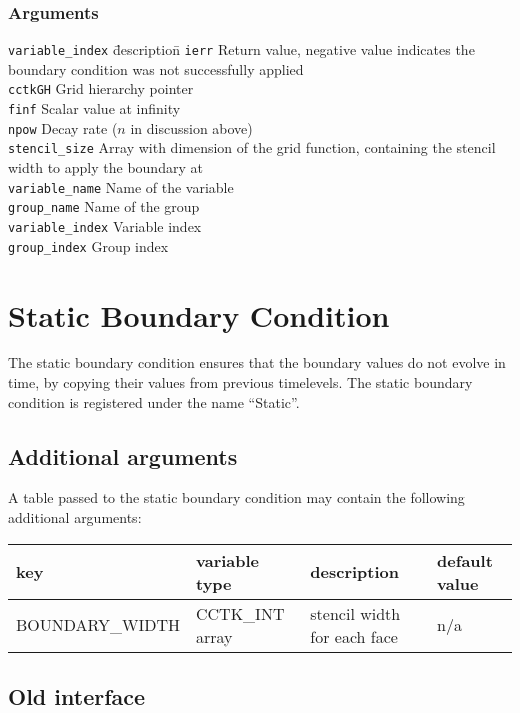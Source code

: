 \documentclass{article}
\begin{document}
\subsubsection*{Arguments}
\begin{tabbing}
{\tt variable\_index} \= description\=\kill
{\tt ierr} \> Return value, negative value indicates the
boundary condition was not successfully applied\\
{\tt cctkGH} \> Grid hierarchy pointer\\
{\tt finf} \> Scalar value at infinity\\
{\tt npow} \> Decay rate ($n$ in discussion above)\\
{\tt stencil\_size} \> Array with dimension of the grid function, containing the stencil width to apply the boundary at\\
{\tt variable\_name} \> Name of the variable\\
{\tt group\_name} \> Name of the group\\
{\tt variable\_index} \> Variable index\\
{\tt group\_index} \> Group index
\end{tabbing}


\section{Static Boundary Condition}

The static boundary condition ensures that the boundary values do not
evolve in time, by copying their values from previous timelevels.  The
static boundary condition is registered under the name ``Static''.

\subsection{Additional arguments}

A table passed to the static boundary condition may contain the
following additional arguments:\\[1mm]
\begin{tabular}{|l|l|l|l|}
\hline
\textbf{key} & \textbf{variable type} & \textbf{description} & \textbf{default value}\\
\hline
BOUNDARY\_WIDTH & CCTK\_INT array & stencil width for each face & n/a\\
\hline
\end{tabular}


\subsection{Old interface}
\end{document}
